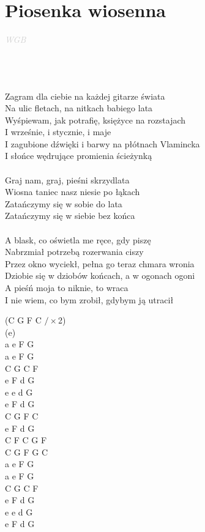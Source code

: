 \documentclass[a5paper, 10pt]{book}
\begin{document}
\section{Piosenka wiosenna}\textcolor{lightgray}{\textit{WGB}}\\~\\
\begin{minipage}[t]{0.8\textwidth}
~\\~\\
Zagram dla ciebie na każdej gitarze świata\\
Na ulic fletach, na nitkach babiego lata\\
Wyśpiewam, jak potrafię, księżyce na rozstajach\\
I wrześnie, i stycznie, i maje\\
I zagubione dźwięki i barwy na płótnach Vlamincka\\
I słońce wędrujące promienia ścieżynką\\
\\
\hspace*{5mm}Graj nam, graj, pieśni skrzydlata\\
\hspace*{5mm}Wiosna taniec nasz niesie po łąkach\\
\hspace*{5mm}Zatańczymy się w sobie do lata\\
\hspace*{5mm}Zatańczymy się w siebie bez końca\\
\\
A blask, co oświetla me ręce, gdy piszę\\
Nabrzmiał potrzebą rozerwania ciszy\\
Przez okno wyciekł, pełna go teraz chmara wronia\\
Dziobie się w dziobów końcach, a w ogonach ogoni\\
A pieśń moja to niknie, to wraca\\
I nie wiem, co bym zrobił, gdybym ją utracił\\
\end{minipage}
\begin{minipage}[t]{0.2\textwidth}
(C G F C $/ \times $2)\\(e)\\
a e F G\\
a e F G\\
C G C F\\
e F d G\\
e e d G\\
e F d G\\

C G F C\\
e F d G\\
C F C G F\\
C G F G C\\

a e F G\\
a e F G\\
C G C F\\
e F d G\\
e e d G\\
e F d G\\

\end{minipage}
\end{document}
